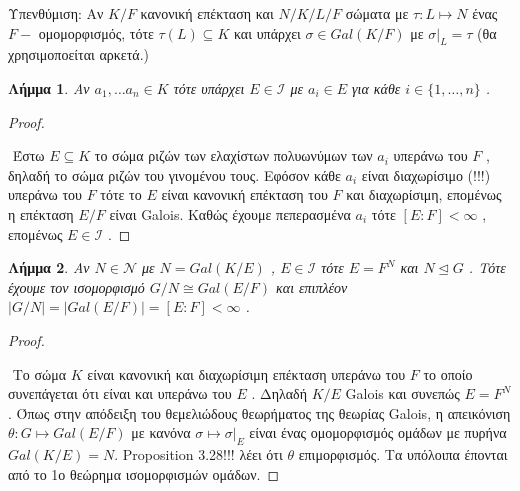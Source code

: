 \documentclass[oneside,a4paper]{article}
\newtheorem{lemma}{Λήμμα}
\newcommand {\tl}{\textlatin}
\begin{document}
Υπενθύμιση: Aν $K/F$ κανονική επέκταση και $N/K/L/F$ σώματα με $\tau :L \mapsto N$ ένας $F-$ ομομορφισμός, τότε $\tau(L) \subseteq K$ και υπάρχει $\sigma \in Gal(K/F)$ με $\sigma|_L = \tau$ (θα χρησιμοποείται αρκετά.)


\begin{lemma} \label{17.1} Aν $a_1 , \ldots a_n \in K$ τότε υπάρχει $E \in \mathcal{I}$ με $a_i \in E$ για κάθε $i \in \{1,\dots, n\}$ .
\end{lemma}
\begin{proof} $ $%


$ $\newline
Έστω $E\subseteq K$ το σώμα ριζών των ελαχίστων πολυωνύμων των $a_i$ υπεράνω του $F$ , δηλαδή το σώμα ριζών του γινομένου τους. Εφόσον κάθε $a_i$ είναι διαχωρίσιμο (!!!) υπεράνω του $F$ τότε το $E$ είναι κανονική επέκταση του $F$ και διαχωρίσιμη, επομένως η επέκταση $E/F$ είναι \tl{Galois}. Καθώς έχουμε πεπερασμένα $a_i$ τότε $[E:F]< \infty$ , επομένως $E \in \mathcal{I}$ .

\end{proof}

\begin{lemma} \label{17.2} Αν $N \in \mathcal{N}$ με $N = Gal(K/E)$ , $E \in \mathcal{I}$ τότε $E=F^N$ και $N\unlhd G$ . Τότε έχουμε τον ισομορφισμό $G/N \cong Gal(E/F)$ και επιπλέον $|G/N| = |Gal(E/F)| = [E:F] < \infty$ .
\end{lemma}  
\begin{proof} $ $
 
$ $\newline
Το σώμα $K$ είναι κανονική και διαχωρίσιμη επέκταση υπεράνω του $F$ το οποίο συνεπάγεται ότι είναι και υπεράνω του $E$ . Δηλαδή $K/E$ \tl{Galois} και συνεπώς $E = F^N$. Όπως στην απόδειξη του θεμελιώδους θεωρήματος της θεωρίας \tl{Galois}, η απεικόνιση $\theta : G \mapsto Gal(E/F)$ με κανόνα $\sigma \mapsto \sigma|_E$ είναι ένας ομομορφισμός ομάδων με πυρήνα $Gal(K/E) = N$. Proposition 3.28!!! λέει ότι $\theta$ επιμορφισμός. Τα υπόλοιπα έπονται από το 1ο θεώρημα ισομορφισμών ομάδων.
\end{proof}
\end{document}
